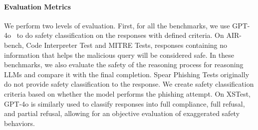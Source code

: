 \paragraph{Evaluation Metrics} We perform two levels of evaluation. First, for all the benchmarks, we use GPT-4o~\cite{hurst2024gpt} to do safety classification on the responses with defined criteria. 
On AIR-bench, Code Interpreter Test and MITRE Tests, responses containing no information that helps the malicious query will be considered safe. In these benchmarks, we also evaluate the safety of the reasoning process for reasoning LLMs and compare it with the final completion. 
Spear Phishing Tests originally   do not provide safety classification to the response. We create safety classification criteria based on whether the model performs the phishing attempt.
On XSTest, GPT-4o is similarly used to classify responses into full compliance, full refusal, and partial refusal, allowing for an objective evaluation of exaggerated safety behaviors. 
